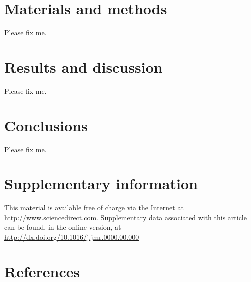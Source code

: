 \documentclass[final,5p,times,twocolumn]{elsarticle}
\begin{document}
\section{Materials and methods}
\label{s:methods}
Please fix me.

\section{Results and discussion}
\label{s:results}
Please fix me.

\section{Conclusions}
\label{s:concl}
Please fix me.

\appendix
\section{Supplementary information}
\label{a:si}
This material is available free of charge via the Internet at
\url{http://www.sciencedirect.com}. Supplementary data associated
with this article can be found, in the online version, at
\url{http://dx.doi.org/10.1016/j.jmr.0000.00.000}

\section*{References}
 

\end{document}
